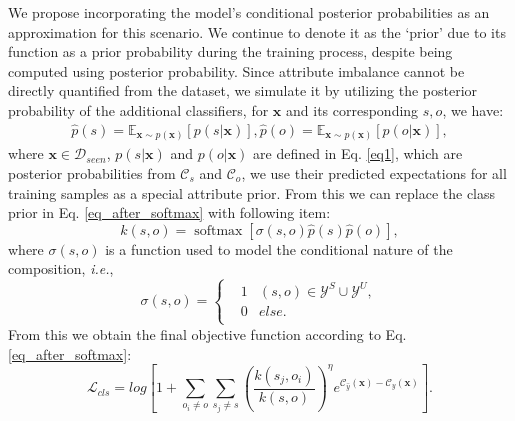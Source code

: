 \documentclass[letterpaper]{article} %
\newcommand{\mx}{\mathbf{x}}
\newcommand{\ie}{\textit{i.e.}}
\theoremstyle{definition}
\begin{document}
We propose incorporating the model's conditional posterior probabilities as an approximation for this scenario. We continue to denote it as the `prior' due to its function as a prior probability during the training process, despite being computed using posterior probability. Since attribute imbalance cannot be directly quantified from the dataset, we simulate it by utilizing the posterior probability of the additional classifiers, for $\mx$ and its corresponding $s,o$, we have:
	\begin{equation}
 	\begin{split}
    \hat{p}(s) = \mathbb{E}_{\mx\sim p(\mx)}[p(s|\mx)],
    \hat{p}(o) = \mathbb{E}_{\mx\sim p(\mx)}[p(o|\mx)],
        \label{eq_estimate}
        \end{split}
	\end{equation}
where $\mx \in \mathcal{D}_{seen}$, $p(s|\mx)$ and $p(o|\mx)$ are defined in Eq. \ref{eq1}, which are posterior probabilities from $\mathcal{C}_{s}$ and $\mathcal{C}_{o}$, we use their predicted expectations for all training samples as a special attribute prior. From this we can replace the class prior in Eq. \ref{eq_after_softmax} with following item:
	\begin{equation}
k(s,o)= \operatorname{softmax}\left[ \sigma(s,o)\hat{p}(s)\hat{p}(o)\right ],
        \label{eq_final_sigma_introduce}
	\end{equation}
where $\sigma(s,o)$ is a function used to model the conditional nature of the composition, \ie,
 \begin{equation}\label{eq_onehot}
\sigma(s,o)=\left\{
\begin{array}{rcl}
&1& (s,o) \in \mathcal{Y}^{S}\cup \mathcal{Y}^{U},\\
&0 &else.\\
\end{array} \right. 
\end{equation}
From this we obtain the final objective function according to Eq. \ref{eq_after_softmax}: 
 	\begin{equation}
\mathcal{L}_{cls}= log \left [1+\sum_{o_i\neq o}\sum_{s_j \neq s}\left (\frac{k(s_j,o_i)}{k(s,o)} \right )^{\eta}e^{ \mathcal{C}_{\hat{y}}(\mx)- \mathcal{C}_{y}(\mx)}\right ].
        \label{eq_final_after_softmax}
	\end{equation}
\end{document}
